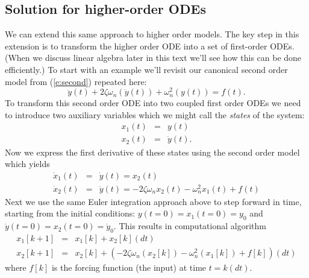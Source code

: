 \begin{soln}
\end{soln}
\fi


\subsection{Solution for higher-order ODEs}
We can extend this same approach to higher order models.  The key step in this extension is to transform the higher order ODE into a set of first-order ODEs.  (When we discuss linear algebra later in this text we'll see how this can be done efficiently.)  To start with an example we'll revisit our canonical second order model from (\ref{e:second}) repeated here:
\begin{equation} 
\ddot{y}(t) + 2 \zeta \omega_n (\dot{y}(t)) + \omega_n^2 (y(t)) = f(t).
\end{equation} 
To transform this second order ODE into two coupled first order ODEs we need to introduce two auxiliary variables which we might call the \emph{states} of the system:
\begin{eqnarray}
x_1(t) & = & y(t) \\
x_2(t) & = & \dot{y}(t).
\end{eqnarray}
Now we express the first derivative of these states using the second order model which yields
\begin{eqnarray}
\dot{x}_1(t) & = & \dot{y}(t) = x_2(t) \\
\dot{x}_2(t) & = & \ddot{y}(t) = -2 \zeta \omega_n x_2(t) - \omega_n^2 x_1(t) + f(t) 
\end{eqnarray}
Next we use the same Euler integration approach above to step forward in time, starting from the initial conditions: $y(t=0)=x_1(t=0)=y_0$ and $\dot{y}(t=0)=x_2(t=0)=\dot{y}_0$.  This results in computational algorithm
\begin{eqnarray}
x_1[k+1] & = & x_1[k] + x_2[k](dt) \\
x_2[k+1] & = & x_2[k] + \left(-2 \zeta \omega_n (x_2[k]) - \omega_n^2 (x_1[k]) + f[k]\right) (dt) 
\end{eqnarray}
where $f[k]$ is the forcing function (the input) at time $t=k(dt)$.

